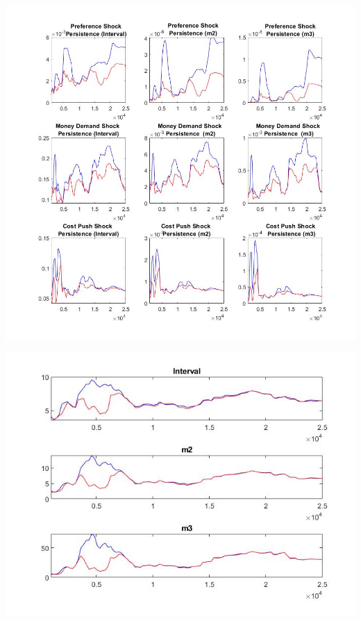 \documentclass[11pt,preprint, authoryear]{elsarticle}
\let\origfigure\figure
\let\endorigfigure\endfigure
\renewenvironment{figure}[1][2] {
    \expandafter\origfigure\expandafter[H]
} {
    \endorigfigure
}
\numberwithin{equation}{section}
\numberwithin{figure}{section}
\numberwithin{table}{section}
\begin{document}
\begin{figure}
\centering
\includegraphics[scale=0.3]{mcflex5.jpg}
\caption{(c) MCMC general - Flexible Money Growth Rate Rule}
\label{mcflex5}
\end{figure}

\begin{figure}
\caption{MCMC general - Constant Money Growth Rule}
\centering
\includegraphics[scale=0.5]{mccon.jpg}
\label{mccon}
\end{figure}
\end{document}
